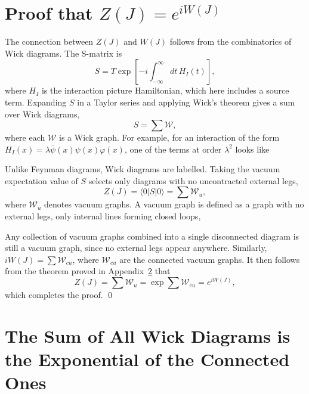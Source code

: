 \appendix
\chapter{Proof that \texorpdfstring{$Z(J) = e^{iW(J)}$}{Z(J) = exp(iW(J))}}
\label{app:connected}

The connection between $Z(J)$ and $W(J)$ follows from the combinatorics
of Wick diagrams. The S-matrix is
\begin{equation}
	S = T\exp\left[-i\int_{-\infty}^{\infty}dt\,H_I(t)\right],
\end{equation}
where $H_I$ is the interaction picture Hamiltonian, which here includes
a source term. Expanding $S$ in a Taylor series and applying Wick's
theorem gives a sum over Wick diagrams,
\begin{equation}
	S = \sum\mathcal{W},
\end{equation}
where each $\mathcal{W}$ is a Wick graph. For example, for an interaction
of the form $H_I(x) = \lambda\bar\psi(x)\psi(x)\varphi(x)$, one of the
terms at order $\lambda^2$ looks like


Unlike Feynman diagrams, Wick diagrams are labelled. Taking the vacuum
expectation value of $S$ selects only diagrams with no uncontracted
external legs,
\begin{equation}
	Z(J) = \langle 0|S|0\rangle = \sum\mathcal{W}_u,
\end{equation}
where $\mathcal{W}_u$ denotes vacuum graphs. A vacuum graph is defined
as a graph with no external legs, only internal lines forming closed
loops,


Any collection of vacuum graphs combined into a single disconnected
diagram is still a vacuum graph, since no external legs appear anywhere.
Similarly, $iW(J) = \sum\mathcal{W}_{cu}$, where $\mathcal{W}_{cu}$ are
the connected vacuum graphs. It then follows from the theorem proved in
Appendix~\ref{app:wick-exponential} that
\begin{equation}
	Z(J) = \sum\mathcal{W}_u = \exp\sum\mathcal{W}_{cu} = e^{iW(J)},
\end{equation}
which completes the proof. \qed
\chapter{The Sum of All Wick Diagrams is the Exponential of the Connected Ones}
\label{app:wick-exponential}

